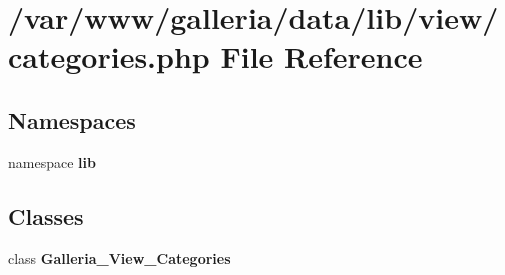 \section{/var/www/galleria/data/lib/view/categories.php File Reference}
\label{categories_8php}
\subsection*{Namespaces}
\begin{CompactItemize}
\item 
namespace {\bf lib}
\end{CompactItemize}
\subsection*{Classes}
\begin{CompactItemize}
\item 
class {\bf Galleria\_\-View\_\-Categories}
\end{CompactItemize}
